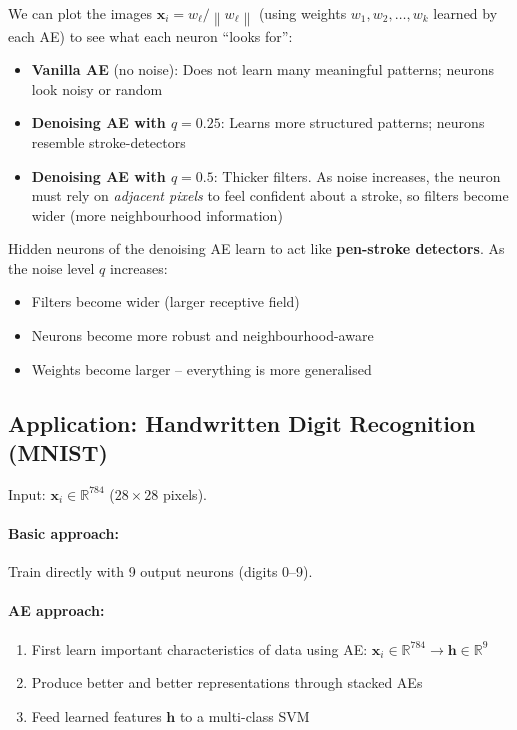 \documentclass[12pt,a4paper]{article}
\newcommand{\R}{\mathbb{R}}
\newcommand{\norm}[1]{\left\|#1\right\|}
\newcommand{\vx}{\mathbf{x}}
\newcommand{\vh}{\mathbf{h}}
\begin{document}
We can plot the images $\vx_i = w_\ell/\norm{w_\ell}$ (using weights $w_1, w_2, \ldots, w_k$ learned by each AE) to see what each neuron ``looks for'':

\begin{itemize}
  \item \textbf{Vanilla AE} (no noise): Does not learn many meaningful patterns; neurons look noisy or random
  \item \textbf{Denoising AE with $q = 0.25$}: Learns more structured patterns; neurons resemble stroke-detectors
  \item \textbf{Denoising AE with $q = 0.5$}: Thicker filters. As noise increases, the neuron must rely on \emph{adjacent pixels} to feel confident about a stroke, so filters become wider (more neighbourhood information)
\end{itemize}

\begin{keybox}
Hidden neurons of the denoising AE learn to act like \textbf{pen-stroke detectors}. As the noise level $q$ increases:
\begin{itemize}
  \item Filters become wider (larger receptive field)
  \item Neurons become more robust and neighbourhood-aware
  \item Weights become larger -- everything is more generalised
\end{itemize}
\end{keybox}

\subsection{Application: Handwritten Digit Recognition (MNIST)}

Input: $\vx_i \in \R^{784}$ ($28\times28$ pixels).

\paragraph{Basic approach:} Train directly with 9 output neurons (digits 0--9).

\paragraph{AE approach:}
\begin{enumerate}
  \item First learn important characteristics of data using AE: $\vx_i \in \R^{784} \to \vh \in \R^9$
  \item Produce better and better representations through stacked AEs
  \item Feed learned features $\vh$ to a multi-class SVM
\end{enumerate}
\end{document}
